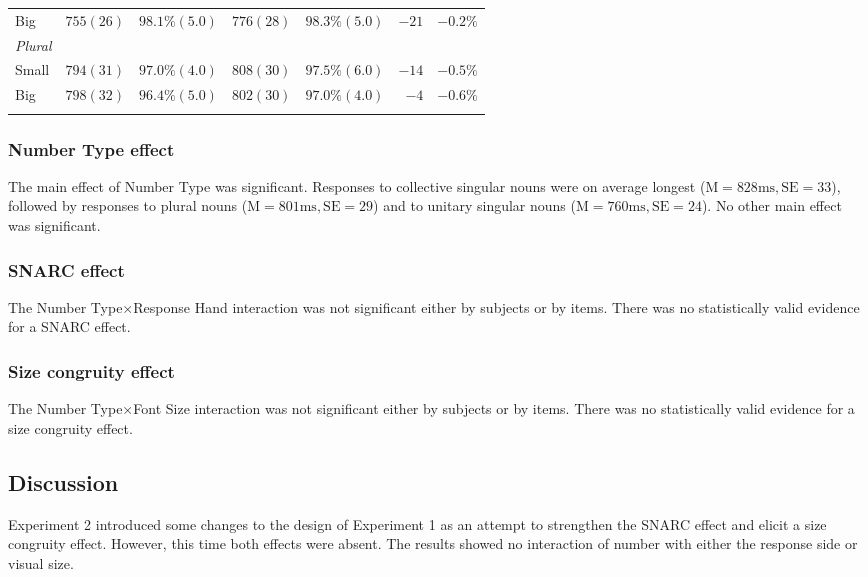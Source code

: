 \documentclass[output=paper]{langscibook}
\begin{document}
\begin{table}
\begin{tabularx}{.97\textwidth}{X r@{~~~}r r@{~~~}r r@{~~~}r}
\hspace{6pt}Big& $755 (26)$ & $98.1\% (5.0)$ & $776 (28)$ & $98.3\% (5.0)$ & $-21$ & $-0.2\%$ \\\tablevspace
\textit{Plural}\\
\hspace{6pt}Small&$794 (31)$ & $97.0\% (4.0)$ & $808 (30)$ & $97.5\% (6.0)$ & $-14$ & $-0.5\%$ \\
\hspace{6pt}Big& $798 (32)$ & $96.4\% (5.0)$ & $802 (30)$ & $97.0\% (4.0)$ & $-4$  & $-0.6\%$ \\
\lspbottomrule
\end{tabularx}
\end{table}


\subsubsection{Number Type effect}
The main effect of Number Type was significant. Responses to collective singular nouns were on average longest ($\text{M}=828\text{ms}, \text{SE}=33$), followed by responses to plural nouns ($\text{M}=801\text{ms}, \text{SE}=29$) and to unitary singular nouns ($\text{M}=760\text{ms}, \text{SE}=24$). No other main effect was significant.

\subsubsection{SNARC effect}
The Number Type×Response Hand interaction was not significant either by subjects or by items. There was no statistically valid evidence for a SNARC effect.

\subsubsection{Size congruity effect}
The Number Type×Font Size interaction was not significant either by subjects or by items. There was no statistically valid evidence for a size congruity effect. 

\subsection{Discussion}
Experiment 2 introduced some changes to the design of Experiment 1 as an attempt to strengthen the SNARC effect and elicit a size congruity effect. However, this time both effects were absent. The results showed no interaction of number with either the response side or visual size. 
\end{document}
